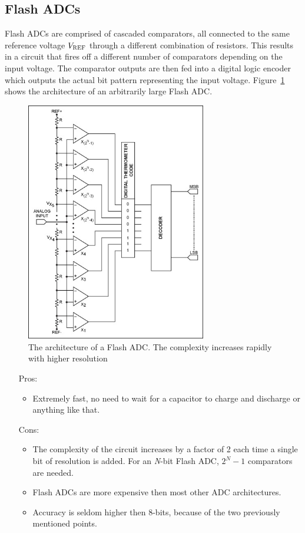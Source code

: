 \documentclass[11pt,a4paper,titlepage]{article}
\begin{document}
	
	\subsection{Flash ADCs}
	Flash ADCs are comprised of cascaded comparators, all connected to the same reference voltage $V_{\textsc{REF}}$ through a different combination of resistors. This results in a circuit that fires off a different number of comparators depending on the input voltage. The comparator outputs are then fed into a digital logic encoder which outputs the actual bit pattern representing the input voltage. Figure~\ref{fig:flashadc} shows the architecture of an arbitrarily large Flash ADC.
	
	\begin{figure}[H]
		\centering
		\includegraphics[width=0.7\textwidth]{graphics/flashadc}
		\caption{The architecture of a Flash ADC. The complexity increases rapidly with higher resolution~\cite{flashadc}}
		\label{fig:flashadc}
	\end{figure}
	
	\begin{itemize}
		\item[Pros:]
		\begin{itemize}
			\item Extremely fast, no need to wait for a capacitor to charge and discharge or anything like that.
		\end{itemize}
		\item[Cons:]
		\begin{itemize}
			\item The complexity of the circuit increases by a factor of 2 each time a single bit of resolution is added. For an \textit{N}-bit Flash ADC, $2^N - 1$ comparators are needed.
			\item Flash ADCs are more expensive then most other ADC architectures.
			\item Accuracy is seldom higher then 8-bits, because of the two previously mentioned points.
		\end{itemize}
	\end{itemize}
	
\end{document}
